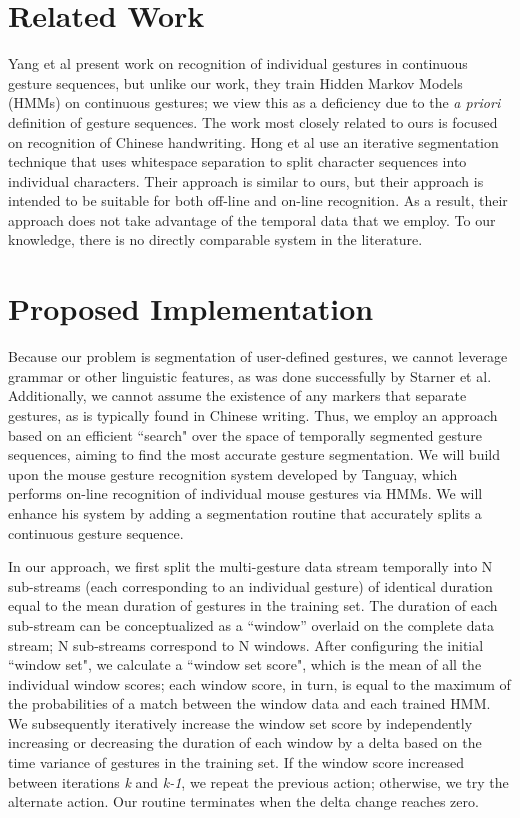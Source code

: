 \documentclass[twoside]{article}
\begin{document}
\begin{multicols}{2}
\section{Related Work}

Yang et al \cite{yang_gesture_1994} present work on recognition of individual
gestures in continuous gesture sequences, but unlike our work, they train Hidden
Markov Models (HMMs) on continuous gestures; we view this as a deficiency due to
the \emph{a priori} definition of gesture sequences. The work most closely
related to ours is focused on recognition of Chinese
handwriting\cite{hong1998segmentation}. Hong et al use an iterative segmentation
technique that uses whitespace separation to split character sequences into
individual characters. Their approach is similar to ours, but their approach is
intended to be suitable for both off-line and on-line recognition. As a result,
their approach does not take advantage of the temporal data that we employ. To our
knowledge, there is no directly comparable system in the literature.

\section{Proposed Implementation}

Because our problem is segmentation of user-defined gestures, we cannot leverage
grammar or other linguistic features, as was done successfully by Starner et
al\cite{starner1994line}. Additionally, we cannot assume the existence of any
markers that separate gestures, as is typically found in Chinese
writing\cite{hong1998segmentation}. Thus, we employ an approach based on an
efficient ``search" over the space of temporally segmented gesture sequences,
aiming to find the most accurate gesture segmentation. We will build upon the
mouse gesture recognition system developed by
Tanguay\cite{tanguay_jr_hidden_1995}, which performs on-line recognition of
individual mouse gestures via HMMs. We will enhance his system by adding a
segmentation routine that accurately splits a continuous gesture sequence.

In our approach, we first split the multi-gesture data stream temporally into N
sub-streams (each corresponding to an individual gesture) of identical duration
equal to the mean duration of gestures in the training set. The duration of each
sub-stream can be conceptualized as a ``window'' overlaid on the complete data
stream; N sub-streams correspond to N windows. After configuring the initial
``window set", we calculate a ``window set score", which is the mean of all the
individual window scores; each window score, in turn, is equal to the maximum of
the probabilities of a match between the window data and each trained HMM. We
subsequently iteratively increase the window set score by independently
increasing or decreasing the duration of each window by a delta based on the
time variance of gestures in the training set. If the window score increased
between iterations \emph{k} and \emph{k-1}, we repeat the previous action;
otherwise, we try the alternate action. Our routine terminates when the delta change
reaches zero.


\end{multicols}
\end{document}
